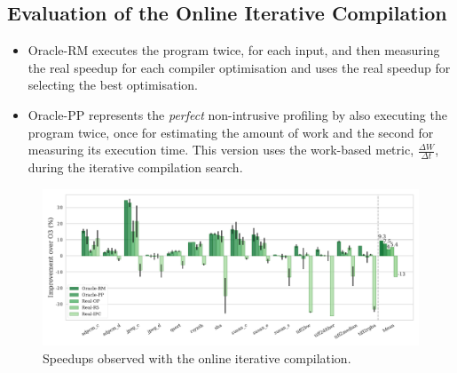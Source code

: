 \documentclass[sigplan,10pt]{acmart}
\newcommand{\itercomp}{{iterative compilation}}
\newcommand{\IterComp}{{Iterative Compilation}}
\begin{document}
\subsection{Evaluation of the Online {\IterComp}}

\begin{itemize}
\item Oracle-RM executes the program twice, for each input, and then measuring the real speedup for each compiler optimisation and uses the real speedup for selecting the best optimisation.
\item Oracle-PP represents the \textit{perfect} non-intrusive profiling by also executing the program twice, once for estimating the amount of work and the second for measuring its execution time.
This version uses the work-based metric, $\frac{\Delta W}{\Delta t}$, during the {\itercomp} search.
\end{itemize}

\begin{figure}[htb]
    \centering
    \includegraphics[width=\textwidth]{figs/speedups.pdf}
    \caption{Speedups observed with the online {\itercomp}.}
    \label{fig:speedups}
\end{figure}


%
%
\end{document}
